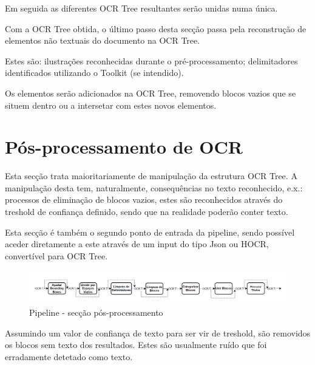 Em seguida as diferentes OCR Tree resultantes serão unidas numa única.




Com a OCR Tree obtida, o último passo desta secção passa pela reconstrução de elementos não textuais do documento na OCR Tree. 

Estes são: ilustrações reconhecidas durante o pré-processamento; delimitadores identificados utilizando o Toolkit (se intendido).

Os elementos serão adicionados na OCR Tree, removendo blocos vazios que se situem dentro ou a intersetar com estes novos elementos.



\section{Pós-processamento de OCR}



Esta secção trata maioritariamente de manipulação da estrutura OCR Tree. A manipulação desta tem, naturalmente, consequências no texto reconhecido, e.x.: processos de eliminação de blocos vazios, estes são reconhecidos através do treshold de confiança definido, sendo que na realidade poderão conter texto.

Esta secção é também o segundo ponto de entrada da pipeline, sendo possível aceder diretamente a este através de um input do tipo Json ou HOCR, convertível para OCR Tree.


\begin{figure}[H]
	\centering
	\includegraphics[width=1\textwidth]{images/diagramas/arquitetura_pipeline_posprocess.png}
	\caption{Pipeline - secção pós-processamento}
	\label{fig:arquitetura_pipeline_posprocess}
\end{figure}



Assumindo um valor de confiança de texto para ser vir de treshold, são removidos os blocos sem texto dos resultados. Estes são usualmente ruído que foi erradamente detetado como texto. 


